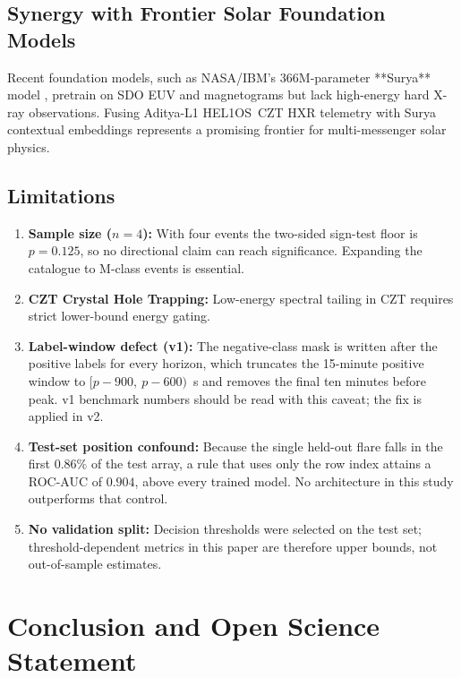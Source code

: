 \documentclass[11pt,a4paper,twocolumn]{article}
\newcommand{\helos}{HEL1OS}
\begin{document}
\subsection{Synergy with Frontier Solar Foundation Models}
Recent foundation models, such as NASA/IBM's 366M-parameter **Surya** model \citep{roy2024surya}, pretrain on SDO EUV and magnetograms but lack high-energy hard X-ray observations. Fusing Aditya-L1 \helos\ CZT HXR telemetry with Surya contextual embeddings represents a promising frontier for multi-messenger solar physics.

\subsection{Limitations}
\begin{enumerate}
    \item \textbf{Sample size ($n=4$):} With four events the two-sided sign-test floor is $p = 0.125$, so no directional claim can reach significance. Expanding the catalogue to M-class events is essential.
    \item \textbf{CZT Crystal Hole Trapping:} Low-energy spectral tailing in CZT requires strict lower-bound energy gating.
    \item \textbf{Label-window defect (v1):} The negative-class mask is written after the positive labels for every horizon, which truncates the 15-minute positive window to $[p-900,\ p-600)$~s and removes the final ten minutes before peak. v1 benchmark numbers should be read with this caveat; the fix is applied in v2.
    \item \textbf{Test-set position confound:} Because the single held-out flare falls in the first $0.86\%$ of the test array, a rule that uses only the row index attains a ROC-AUC of $0.904$, above every trained model. No architecture in this study outperforms that control.
    \item \textbf{No validation split:} Decision thresholds were selected on the test set; threshold-dependent metrics in this paper are therefore upper bounds, not out-of-sample estimates.
\end{enumerate}

\section{Conclusion and Open Science Statement}
\label{sec:conclusion}
\end{document}
